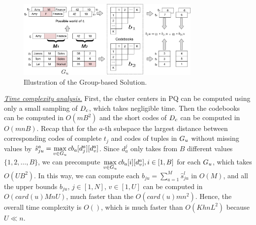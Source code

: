 \begin{figure}[t]
    \centering
    \includegraphics[width=0.8\textwidth]{figs/distance}
    \caption{Illustration of the Group-based Solution.}
    \label{fig:distance}
\end{figure}


\noindent \textit{\underline{Time complexity analysis.}} First, the cluster centers in PQ can be computed using only a small sampling of $D_c$, which takes negligible time. Then the codebooks can be computed in $O(mB^2)$ and the short codes of $D_c$ can be computed in $O(mnB)$. Recap that for the $a$-th subspace the largest distance between corresponding codes of complete $t_j$ and codes of tuples in $G_u$ without missing values by $\hat{s}_{ju}^a = \max\limits_{v\in G_u}cb_a[d_{j}^a][d_v^a]$. Since $d_a^j$ only takes from $B$ different values $\{1, 2, \dots, B\}$, we can precompute $\max\limits_{v\in G_u}cb_a[i][d_v^a], i\in[1, B]$ for each $G_u$, which takes $O(UB^2)$. In this way, we can compute each $b_{ju}=\sum_{a=1}^{M}\hat{s}^l_{ju}$ in $O(M)$, and all the upper bounds $b_{ju}$, $j\in [1,N]$, $v\in [1,U]$ can be computed in  $O(card(u)MnU)$, much faster than the $O(card(u)mn^2)$. Hence, the overall time complexity is $O()$, which is much faster than $O(KhnL^2)$ because $U \ll n$.

